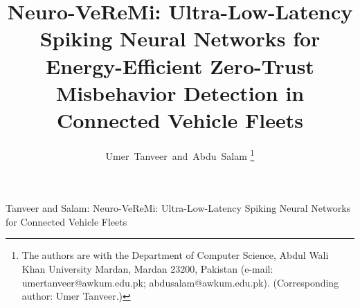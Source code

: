\documentclass[journal]{IEEEtran}
\begin{document}
\title{Neuro-VeReMi: Ultra-Low-Latency Spiking Neural Networks for Energy-Efficient Zero-Trust Misbehavior Detection in Connected Vehicle Fleets}

\author{Umer~Tanveer~and~Abdu~Salam%
\thanks{The authors are with the Department of Computer Science, Abdul Wali Khan University Mardan, Mardan 23200, Pakistan (e-mail: umertanveer@awkum.edu.pk; abdusalam@awkum.edu.pk). (Corresponding author: Umer Tanveer.)}}

%
{Tanveer and Salam: Neuro-VeReMi: Ultra-Low-Latency Spiking Neural Networks for Connected Vehicle Fleets}

\maketitle
\end{document}
